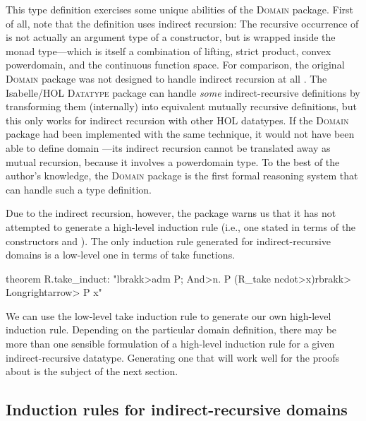 This type definition exercises some unique abilities of the  \textsc{Domain} package. First of all, note that the definition uses indirect recursion: The recursive occurrence of  is not actually an argument type of a constructor, but is wrapped inside the  monad type---which is itself a combination of lifting, strict product, convex powerdomain, and the continuous function space. For comparison, the original  \textsc{Domain} package was not designed to handle indirect recursion at all \cite{Oheimb97}. The Isabelle/HOL \textsc{Datatype} package can handle \emph{some} indirect-recursive definitions by transforming them (internally) into equivalent mutually recursive definitions, but this only works for indirect recursion with other HOL datatypes. If the \textsc{Domain} package had been implemented with the same technique, it would not have been able to define domain ---its indirect recursion cannot be translated away as mutual recursion, because it involves a powerdomain type. To the best of the author's knowledge, the  \textsc{Domain} package is the first formal reasoning system that can handle such a type definition.

Due to the indirect recursion, however, the package warns us that it has not attempted to generate a high-level induction rule (i.e., one stated in terms of the constructors  and ). The only induction rule generated for indirect-recursive domains is a low-level one in terms of take functions.

\begin{isacode}
theorem R.take_induct: "\<lbrakk>adm P; \<And>n. P (R_take n\<cdot>x)\<rbrakk> \<Longrightarrow> P x"
\end{isacode}

We can use the low-level take induction rule to generate our own high-level induction rule. Depending on the particular domain definition, there may be more than one sensible formulation of a high-level induction rule for a given indirect-recursive datatype. Generating one that will work well for the proofs about  is the subject of the next section.

\subsection{Induction rules for indirect-recursive domains}
\label{sec:case-induct-R}

